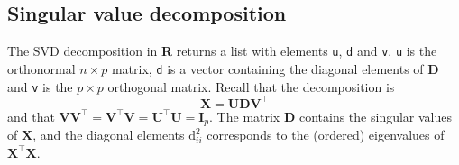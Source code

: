 \documentclass[]{book}
\newenvironment{Shaded}{\begin{snugshade}}{\end{snugshade}}
\newcommand{\KeywordTok}[1]{\textcolor[rgb]{0.13,0.29,0.53}{\textbf{#1}}}
\newcommand{\DecValTok}[1]{\textcolor[rgb]{0.00,0.00,0.81}{#1}}
\newcommand{\StringTok}[1]{\textcolor[rgb]{0.31,0.60,0.02}{#1}}
\newcommand{\CommentTok}[1]{\textcolor[rgb]{0.56,0.35,0.01}{\textit{#1}}}
\newcommand{\OperatorTok}[1]{\textcolor[rgb]{0.81,0.36,0.00}{\textbf{#1}}}
\newcommand{\NormalTok}[1]{#1}
\theoremstyle{definition}
\theoremstyle{definition}
\theoremstyle{definition}
\theoremstyle{remark}
\begin{document}
\begin{Shaded}
\end{Shaded}

\subsection{Singular value
decomposition}\label{singular-value-decomposition}

The SVD decomposition in \textbf{R} returns a list with elements
\texttt{u}, \texttt{d} and \texttt{v}. \texttt{u} is the orthonormal
\(n \times p\) matrix, \texttt{d} is a vector containing the diagonal
elements of \(\mathbf{D}\) and \texttt{v} is the \(p \times p\)
orthogonal matrix. Recall that the decomposition is
\[\mathbf{X} = \mathbf{UDV}^\top\] and that
\(\mathbf{VV}^\top= \mathbf{V}^\top\mathbf{V}=\mathbf{U}^\top\mathbf{U}=\mathbf{I}_p\).
The matrix \(\mathbf{D}\) contains the singular values of
\(\mathbf{X}\), and the diagonal elements \(\mathrm{d}_{ii}^2\)
corresponds to the (ordered) eigenvalues of
\(\mathbf{X}^\top\mathbf{X}\).

\begin{Shaded}
\end{Shaded}
\end{document}
